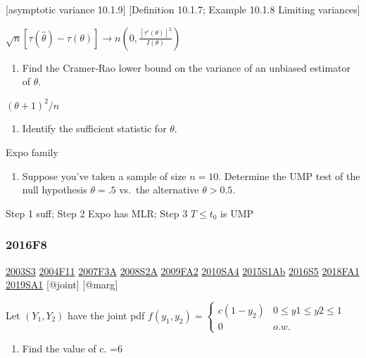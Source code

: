 \documentclass[6pt,twocolumn,Portrait]{article}
\providecommand{\tightlist}{%
  \setlength{\itemsep}{0pt}\setlength{\parskip}{0pt}}
\begin{document}
{[}asymptotic variance 10.1.9{]} {[}Definition 10.1.7; Example 10.1.8
Limiting variances{]}

\(\sqrt{n}[\tau(\hat\theta)-\tau(\theta)]\to n(0,\frac{[\tau'(\theta)]^2}{I(\theta)})\)

\begin{enumerate}
\def\labelenumi{(\alph{enumi})}
\setcounter{enumi}{4}
\tightlist
\item
  Find the Cramer-Rao lower bound on the variance of an unbiased
  estimator of \(\theta\).
\end{enumerate}

\((\theta+1)^2/n\)

\begin{enumerate}
\def\labelenumi{(\alph{enumi})}
\setcounter{enumi}{5}
\tightlist
\item
  Identify the sufficient statistic for \(\theta\).
\end{enumerate}

Expo family

\begin{enumerate}
\def\labelenumi{(\alph{enumi})}
\setcounter{enumi}{6}
\tightlist
\item
  Suppose you've taken a sample of size \(n=10\). Determine the UMP test
  of the null hypothesis \(\theta=.5\) vs.~the alternative
  \(\theta>0.5\).
\end{enumerate}

Step 1 suff; Step 2 Expo has MLR; Step 3 \(T\le t_0\) is UMP

\hypertarget{f8-4}{%
\subsubsection{2016F8}\label{f8-4}}

\protect\hyperlink{s3}{2003S3} \protect\hyperlink{f11}{2004F11}
\protect\hyperlink{f3a}{2007F3A} \protect\hyperlink{s2a}{2008S2A}
\protect\hyperlink{fa2}{2009FA2} \protect\hyperlink{sa4-1}{2010SA4}
\protect\hyperlink{s1ab}{2015S1Ab} \protect\hyperlink{s5-4}{2016S5}
\protect\hyperlink{fa1-4}{2018FA1} \protect\hyperlink{sa1-3}{2019SA1}
{[}@joint{]} {[}@marg{]}

Let \((Y_1,Y_2)\) have the joint pdf
\(f(y_1,y_2)=\begin{cases}c(1-y_2)&0\le y1\le y2\le 1\\0& o.w.\end{cases}\)

\begin{enumerate}
\def\labelenumi{(\alph{enumi})}
\tightlist
\item
  Find the value of c. =6
\end{enumerate}
\end{document}
